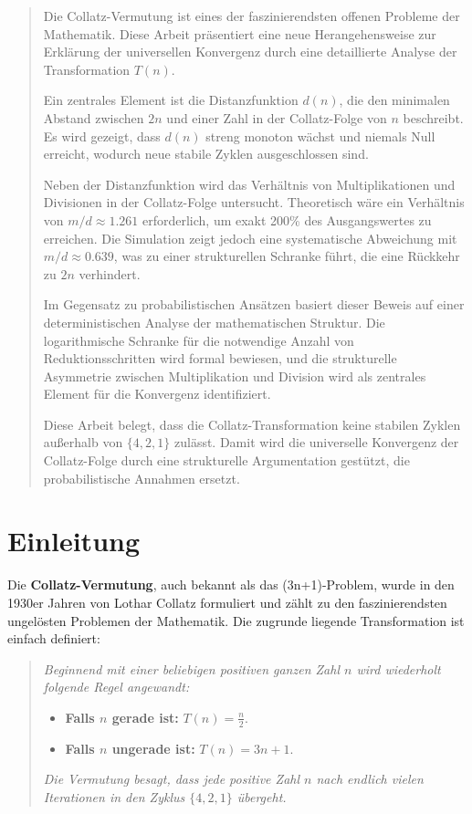 \documentclass[a4paper,12pt]{article}
\begin{document}
\begin{abstract}
    Die Collatz-Vermutung ist eines der faszinierendsten offenen Probleme der Mathematik. Diese Arbeit präsentiert eine neue Herangehensweise zur Erklärung der universellen Konvergenz durch eine detaillierte Analyse der Transformation $T(n)$. 
    
    Ein zentrales Element ist die Distanzfunktion $d(n)$, die den minimalen Abstand zwischen $2n$ und einer Zahl in der Collatz-Folge von $n$ beschreibt. Es wird gezeigt, dass $d(n)$ streng monoton wächst und niemals Null erreicht, wodurch neue stabile Zyklen ausgeschlossen sind.

    Neben der Distanzfunktion wird das Verhältnis von Multiplikationen und Divisionen in der Collatz-Folge untersucht. Theoretisch wäre ein Verhältnis von $m/d \approx 1.261$ erforderlich, um exakt 200\% des Ausgangswertes zu erreichen. Die Simulation zeigt jedoch eine systematische Abweichung mit $m/d \approx 0.639$, was zu einer strukturellen Schranke führt, die eine Rückkehr zu $2n$ verhindert.

    Im Gegensatz zu probabilistischen Ansätzen basiert dieser Beweis auf einer deterministischen Analyse der mathematischen Struktur. Die logarithmische Schranke für die notwendige Anzahl von Reduktionsschritten wird formal bewiesen, und die strukturelle Asymmetrie zwischen Multiplikation und Division wird als zentrales Element für die Konvergenz identifiziert.

    Diese Arbeit belegt, dass die Collatz-Transformation keine stabilen Zyklen außerhalb von $\{4, 2, 1\}$ zulässt. Damit wird die universelle Konvergenz der Collatz-Folge durch eine strukturelle Argumentation gestützt, die probabilistische Annahmen ersetzt.
\end{abstract}



\newpage
\tableofcontents

\clearpage





\section{Einleitung}
Die \textbf{Collatz-Vermutung}, auch bekannt als das (3n+1)-Problem, wurde in den 1930er Jahren von Lothar Collatz formuliert und zählt zu den faszinierendsten ungelösten Problemen der Mathematik. Die zugrunde liegende Transformation ist einfach definiert:

\begin{quote}
\textit{Beginnend mit einer beliebigen positiven ganzen Zahl \( n \) wird wiederholt folgende Regel angewandt:}
\begin{itemize}
    \item \textbf{Falls \( n \) gerade ist:} \( T(n) = \frac{n}{2} \).
    \item \textbf{Falls \( n \) ungerade ist:} \( T(n) = 3n + 1 \).
\end{itemize}
\textit{Die Vermutung besagt, dass jede positive Zahl \( n \) nach endlich vielen Iterationen in den Zyklus \( \{4, 2, 1\} \) übergeht.}
\end{quote}
\end{document}
